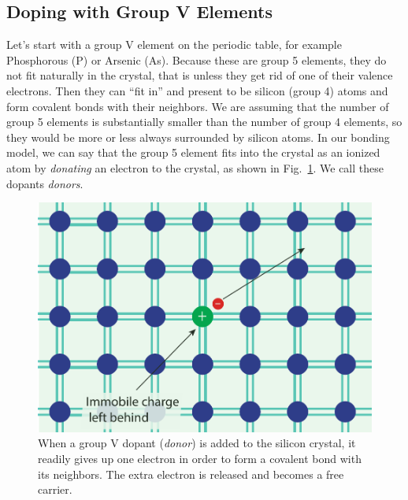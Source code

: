 \subsection{Doping with Group V Elements}
Let’s start with a group V element on the periodic table, for example Phosphorous (P) or Arsenic (As).  Because these are group 5 elements, they do not fit naturally in the crystal, that is unless they get rid of one of their valence electrons.  Then they can “fit in” and present to be silicon (group 4) atoms and form covalent bonds with their neighbors.  We are assuming that the number of group 5 elements is substantially smaller than the number of group 4 elements, so they would be more or less always surrounded by silicon atoms.  In our bonding model, we can say that the group 5 element fits into the crystal as an ionized atom by \emph{donating} an electron to the crystal, as shown in Fig.~\ref{fig:silicon_dopant_V}.   We call these dopants \emph{donors}.
\begin{figure}[tb]
\begin{center}
\includegraphics[width=.5\columnwidth]{silicon_dopant_V}
\end{center}
\caption{When a group V dopant (\emph{donor}) is added to the silicon crystal, it readily gives up one electron in order to form a covalent bond with its neighbors.  The extra electron is released and becomes a free carrier. }
\label{fig:silicon_dopant_V}
\end{figure}
